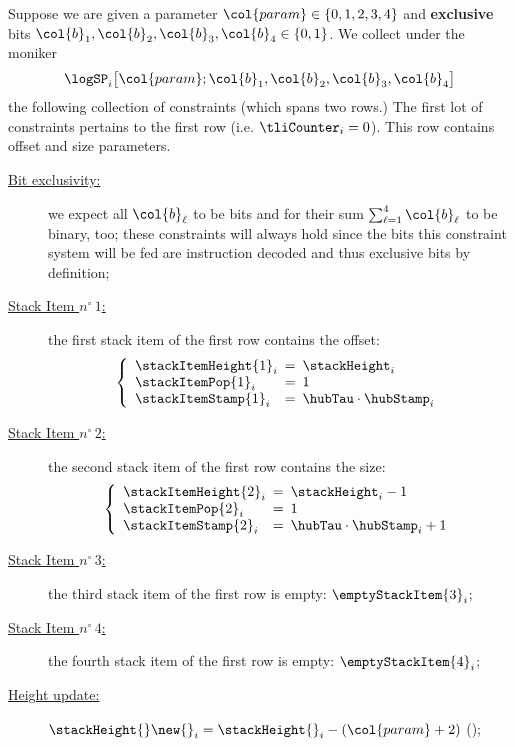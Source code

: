 \def\bSum                             {\textsf{bSum}}


Suppose we are given a parameter $\col{param} \in \{ 0, 1, 2, 3, 4 \}$ and \textbf{exclusive} bits $\col{b}_{1}, \col{b}_{2}, \col{b}_{3}, \col{b}_{4} \in \{ 0, 1 \}$.
We collect under the moniker
\[ 
	\logSP_{i}
	\big[ \col{param}; \col{b}_{1}, \col{b}_{2}, \col{b}_{3}, \col{b}_{4} \big]
\]
the following collection of constraints (which spans two rows.) The first lot of constraints pertains to the first row (i.e. $\tliCounter_{i} = 0$). This row contains offset and size parameters.
\begin{description}
	\item[\underline{Bit exclusivity:}]
		we expect all $\col{b}_\ell$ to be bits and for their sum $\sum_{\ell = 1}^4\col{b}_{\ell}$ to be binary, too;
		these constraints will always hold since the bits this constraint system will be fed are instruction decoded and thus exclusive bits by definition; 
	\item[\underline{Stack Item $n^\circ\,1$:}] the first stack item of the first row contains the offset:
		\[
			\left\{
				\begin{array}{lcl}
					\stackItemHeight{1}_{i}	& \!\!\! = \!\!\! & \stackHeight_{i} \\
					\stackItemPop{1}_{i}	& \!\!\! = \!\!\! & 1 \\
					\stackItemStamp{1}_{i}	& \!\!\! = \!\!\! & \hubTau \cdot \hubStamp_{i} 
				\end{array}
				\right.
			\]
		\item[\underline{Stack Item $n^\circ\,2$:}] the second stack item of the first row contains the size:
			\[
				\left\{
					\begin{array}{lcl}
						\stackItemHeight{2}_{i}	& \!\!\! = \!\!\! & \stackHeight_{i} - 1 \\
						\stackItemPop{2}_{i}	& \!\!\! = \!\!\! & 1 \\
						\stackItemStamp{2}_{i}	& \!\!\! = \!\!\! & \hubTau \cdot \hubStamp_{i} + 1
					\end{array}
					\right.
				\]
			\item[\underline{Stack Item $n^\circ\,3$:}] the third stack item of the first row is empty: $\emptyStackItem{3}_{i}$;
			\item[\underline{Stack Item $n^\circ\,4$:}] the fourth stack item of the first row is empty: $\emptyStackItem{4}_{i}$;
			\item[\underline{Height update:}] $\stackHeight{}\new{}_{i} = \stackHeight{}_{i} - (\col{param} + 2)$ \quad (\sanityCheck);
\end{description}

